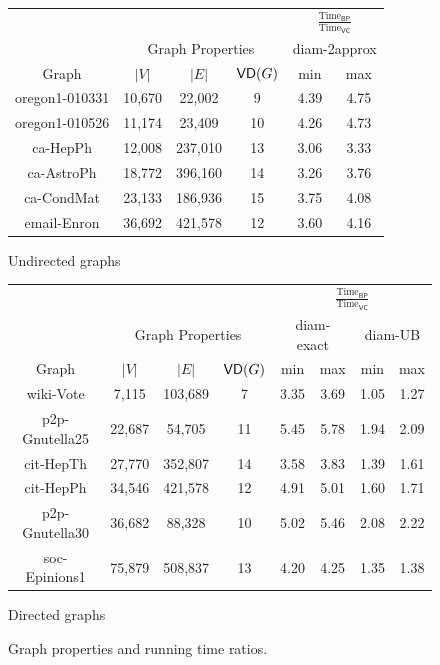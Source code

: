 \begin{figure}[htb]
  \centering
  \begin{subtable}[b]{\linewidth}
    \centering
    \begin{tabular}{cccccc}
      \toprule
      &  & & &  \multicolumn{2}{c}{$\frac{\mbox{Time}_\mathsf{BP}}{\mbox{Time}_\mathsf{VC}}$} \\
      \cmidrule(r){5-6}
      & \multicolumn{3}{c}{Graph Properties} & \multicolumn{2}{c}{diam-2approx} \\
      \cmidrule(r){2-4} \cmidrule(r){5-6}
      Graph & $|V|$ & $|E|$ & $\mathsf{VD}(G)$ & min & max \\
      \midrule
      oregon1-010331 & 10,670 & 22,002 & 9 & 4.39 & 4.75\\  %
      oregon1-010526 & 11,174 & 23,409 & 10 & 4.26 & 4.73 \\
      ca-HepPh & 12,008 & 237,010 & 13 & 3.06 & 3.33\\
      ca-AstroPh & 18,772 & 396,160  & 14 & 3.26 & 3.76\\
      ca-CondMat & 23,133 & 186,936 & 15 & 3.75 & 4.08\\
      email-Enron & 36,692 & 421,578 & 12 & 3.60 & 4.16\\
      \bottomrule
    \end{tabular}
  \caption{Undirected graphs}
  \label{tab:expUndir}
  \end{subtable}

  \begin{subtable}[b]{\linewidth}
    \centering
    \begin{tabular}{cccccccc}
      \toprule
      & & & & \multicolumn{4}{c}{$\frac{\mbox{Time}_\mathsf{BP}}{\mbox{Time}_\mathsf{VC}}$} \\
      \cmidrule(r){5-8}
      & \multicolumn{3}{c}{Graph Properties} & \multicolumn{2}{c}{diam-exact} &
      \multicolumn{2}{c}{diam-UB} \\
      \cmidrule(r){2-4} \cmidrule(r){5-6} \cmidrule(r){7-8}
      Graph & $|V|$ & $|E|$ & $\mathsf{VD}(G)$ & min & max & min & max \\
      \midrule
      wiki-Vote & 7,115 & 103,689  & 7 & 3.35 & 3.69 & 1.05 & 1.27 \\
      p2p-Gnutella25 & 22,687 & 54,705 & 11 & 5.45 & 5.78 & 1.94 & 2.09 \\
      cit-HepTh & 27,770 & 352,807 & 14 & 3.58 & 3.83 & 1.39 & 1.61 \\
      cit-HepPh & 34,546 & 421,578 & 12 & 4.91 & 5.01 & 1.60 & 1.71 \\ 
      p2p-Gnutella30 & 36,682 & 88,328 & 10 & 5.02 & 5.46 & 2.08 & 2.22\\
      soc-Epinions1 & 75,879 & 508,837 & 13 & 4.20 & 4.25 & 1.35 & 1.38\\
      \bottomrule
    \end{tabular} 
  \caption{Directed graphs}
  \label{tab:expDir}
  \end{subtable}
  \caption{Graph properties and running time ratios.}
  \label{fig:centrsampltables}
\end{figure}

